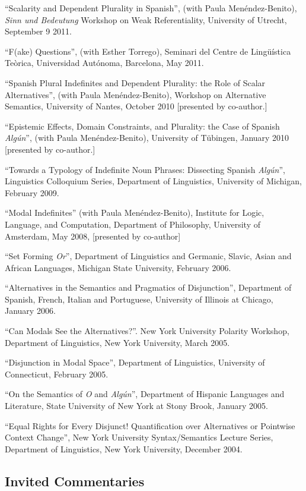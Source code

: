 \documentclass[11pt]{article}
\begin{document}
``Scalarity and Dependent Plurality in Spanish'',
(with Paula Men\'endez-Benito), \textit{Sinn und Bedeutung} Workshop
on Weak Referentiality, University of Utrecht, September 9 2011.

``F(ake) Questions'', (with Esther Torrego), Seminari del
Centre de Ling\"{u}\'istica Te\`orica, Universidad Aut\'onoma, Barcelona, May 2011. 

``Spanish Plural Indefinites and Dependent Plurality:
the Role of Scalar Alternatives'', (with Paula Men\'endez-Benito),
Workshop on Alternative Semantics, University of Nantes, October 2010 [presented by co-author.]

``Epistemic Effects, Domain Constraints, and Plurality: the Case
of Spanish \textit{Alg\'un}'', (with Paula Men\'endez-Benito),
University of T\"ubingen, January 2010 [presented by co-author.]


``Towards a Typology of Indefinite Noun Phrases: Dissecting Spanish \textit{Alg\'un}'', Linguistics Colloquium Series, Department of Linguistics, University of Michigan, February 2009. 

``Modal Indefinites'' (with Paula Men\'endez-Benito),  Institute for Logic, Language, and Computation, Department of Philosophy, University of
  Amsterdam, May 2008, [presented by co-author]

``Set Forming \textit{Or}'', Department of Linguistics and Germanic, Slavic, Asian and African Languages, Michigan State University, February 2006.

``Alternatives in the Semantics and Pragmatics of Disjunction'', Department of Spanish, French, Italian and Portuguese, University of Illinois at Chicago, January 2006. 

``Can Modals See the Alternatives?''. New York University Polarity Workshop, Department of Linguistics, New York University, March 2005. 

``Disjunction in Modal Space'', Department of Linguistics, University of Connecticut, February 2005. 


``On the Semantics of \textit{O} and \textit{Alg\'un}'', Department of Hispanic Languages and Literature, State University of New York at Stony Brook, January 2005. 
 
``Equal Rights for Every Disjunct! Quantification over Alternatives or Pointwise Context Change'', New York University Syntax/Semantics Lecture Series, Department of Linguistics, New York University, December 2004.


\subsection*{Invited Commentaries}
\end{document}
